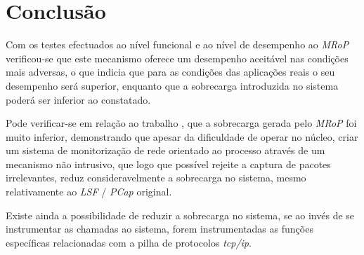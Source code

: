 \section{Conclusão}
\label{sec:five_chap_conclusion}

Com os testes efectuados ao nível funcional e ao nível de desempenho ao \textit{MRoP} verificou-se que este mecanismo oferece um desempenho aceitável nas condições mais adversas, o que indicia que para as condições das aplicações reais o seu desempenho será superior, enquanto que a sobrecarga introduzida no sistema poderá ser inferior ao constatado.

Pode verificar-se em relação ao trabalho \cite{Farruca:2009}, que a sobrecarga gerada pelo \textit{MRoP} foi muito inferior, demonstrando que apesar da dificuldade de operar no núcleo, criar um sistema de monitorização de rede orientado ao processo através de um mecanismo não intrusivo, que logo que possível rejeite a captura de pacotes irrelevantes, reduz consideravelmente a sobrecarga no sistema, mesmo relativamente ao \textit{LSF} / \textit{PCap} original.

Existe ainda a possibilidade de reduzir a sobrecarga no sistema, se ao invés de se instrumentar as chamadas ao sistema, forem instrumentadas as funções específicas relacionadas com a pilha de protocolos \textit{tcp/ip}.
